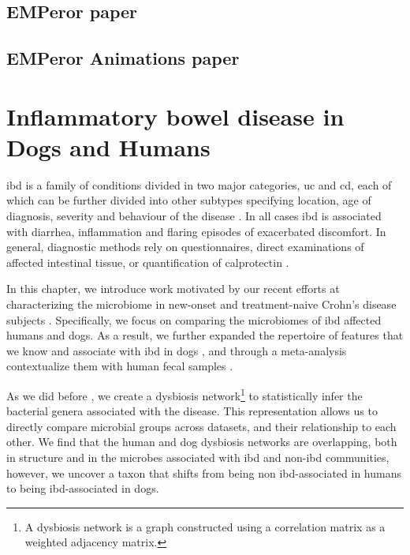 \documentclass[12pt,chapterheads]{ucsd}
\begin{document}
\ifdefined\RELEASE
    
    
\else
    \section{EMPeror paper}\label{section_emperor}
    \section{EMPeror Animations paper}\label{section_animations}
\fi

\chapter{Inflammatory bowel disease in Dogs and Humans}\label{chapter_dogs}

\gls{ibd} is a family of conditions divided in two major categories, \gls{uc} 
and \gls{cd}, each of which can be further divided into other subtypes 
specifying location, age of diagnosis, severity and behaviour of the disease 
\cite{RN4265}.  In all cases \gls{ibd} is associated with diarrhea, 
inflammation and flaring episodes of exacerbated discomfort. In general, 
diagnostic methods rely on questionnaires, direct examinations of affected 
intestinal tissue, or quantification of calprotectin \cite{Sipponen2008}.

In this chapter, we introduce work motivated by our recent efforts at 
characterizing the microbiome in new-onset and treatment-naive Crohn's disease 
subjects \cite{RN154}. Specifically, we focus on comparing the microbiomes of 
\gls{ibd} affected humans and dogs. As a result, we further expanded the 
repertoire of features that we know and associate with \gls{ibd} in dogs 
\cite{RN153}, and through a meta-analysis contextualize them with human fecal 
samples \cite{RN154}.

As we did before \cite{RN154}, we create a dysbiosis network\footnote{A 
dysbiosis network is a graph constructed using a correlation matrix as a 
weighted adjacency matrix.} to statistically infer the bacterial genera 
associated with the disease. This representation allows us to directly compare 
microbial groups across datasets, and their relationship to each other. We find 
that the human and dog dysbiosis networks are overlapping, both in structure 
and in the microbes associated with \gls{ibd} and non-\gls{ibd} communities, 
however, we uncover a taxon that shifts from being non \gls{ibd}-associated in 
humans to being \gls{ibd}-associated in dogs.
\end{document}
